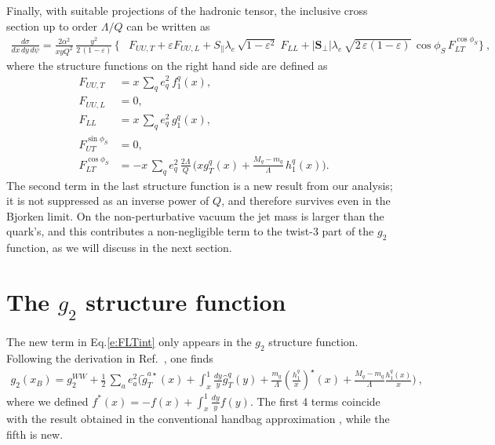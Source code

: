 \documentclass[preprintnumbers,floatfix,nofootinbib]{revtex4}
\newcommand{\xbj}{x}                   %
\newcommand{\mj}{M_q}
\newcommand{\mq}{m_q}
\begin{document}
Finally, with suitable projections of the hadronic tensor, the inclusive cross section up to order $\Lambda/Q$ can be written as
\begin{align}
\frac{d\sigma}{d\xbj \, dy\, d\psi}
=
\frac{2 \alpha^2}{\xbj y Q^2}\,
\frac{y^2}{2\,(1-\varepsilon)}\, 
\biggl\{
&F_{UU ,T} + \varepsilon F_{UU ,L}
+ S_\parallel \lambda_e\,
  \sqrt{1-\varepsilon^2}\; 
F_{LL}
+ |\bm{S}_\perp| \lambda_e\, \sqrt{2\,\varepsilon (1-\varepsilon)}\, 
  \cos\phi_S\, 
F_{LT}^{\cos \phi_S}
 \biggr\} \ ,
\label{e:crossdis}
\end{align}
where the structure functions on the right hand side are defined as
\begin{align}
F_{UU ,T} &= \xbj\,\sum_q e_q^2\,f_1^q(\xbj),
\\
F_{UU ,L} &= 0,
\\
F_{LL} &=\xbj\,\sum_q e_q^2\,g_1^q(\xbj),
\\
F_{UT}^{\sin \phi_S}&=0,
\label{e:FUTint}
\\
F_{LT}^{\cos \phi_S}&=-\xbj\,\sum_q e_q^2\, \frac{2\Lambda}{Q}\,
\biggl(\xbj  g_T^q(\xbj)
   + \frac{\mj -\mq}{\Lambda} \, h_{1}^q(\xbj) \biggr).
\label{e:FLTint}
\end{align}
The second term in the last structure function is a new result from our
analysis; it is not suppressed as an inverse power of $Q$, and therefore
survives even in the Bjorken limit. On the non-perturbative
vacuum the jet mass is larger than the quark's, and this contributes a
non-negligible term to the twist-3 part of the $g_2$ function, as we will
discuss in the next section.  

 

\section{The $g_2$ structure function}

The new term in Eq.\eqref{e:FLTint} only appears in the $g_2$ structure function. Following the derivation in Ref.~\cite{ABMS}, one finds
\begin{align}
\label{e:g2}
  g_2(x_B) = g_2^{WW} + \frac{1}{2}\,\sum_a e_a^2
\biggl(
    \widetilde g_T^{a \star}(x) 
    + \int_x^1\frac{dy}{y} \widehat{g}_T^q(y) 
    + \frac{\mq}{\Lambda} \left(\frac{h_1^q}{x}\right)^\star(x) 
    + \frac{\mj-\mq}{\Lambda} \frac{h_1^q(x)}{x} 
\Biggr) \ ,
\end{align}
where we defined $f^*(x) = -f(x) + \int_x^1\frac{dy}{y} f(y)$. The first 4
terms coincide with the result obtained in the conventional handbag
approximation \cite{ABMS}, while the fifth is new. 
\end{document}
